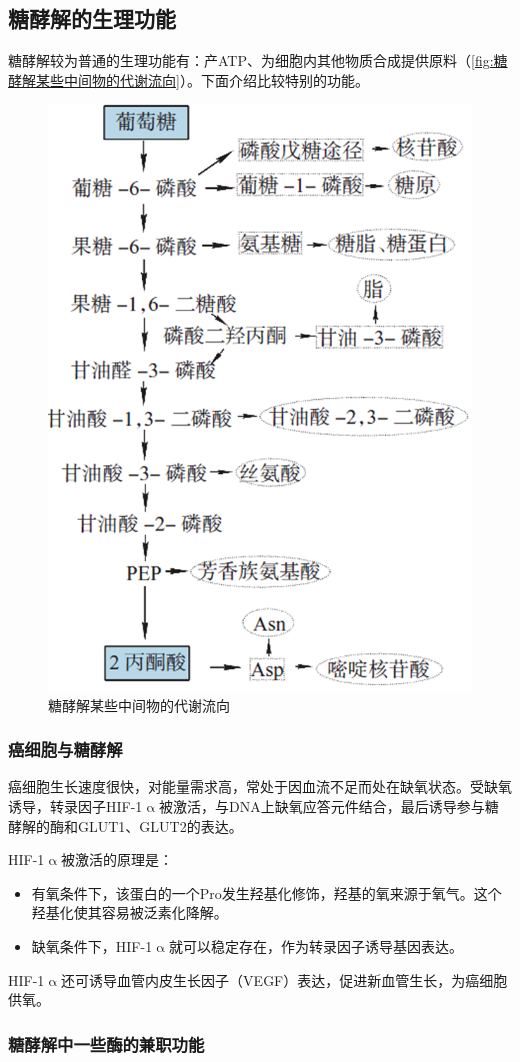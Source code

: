 \subsection{糖酵解的生理功能}

糖酵解较为普通的生理功能有：产ATP、为细胞内其他物质合成提供原料（\autoref{fig:糖酵解某些中间物的代谢流向}）。下面介绍比较特别的功能。

\begin{figure}[htbp]
	\centering
	\includegraphics[width=0.4\linewidth]{Pics/糖酵解某些中间物的代谢流向}
	\caption{糖酵解某些中间物的代谢流向}
	\label{fig:糖酵解某些中间物的代谢流向}
\end{figure}

\subsubsection{癌细胞与糖酵解}

癌细胞生长速度很快，对能量需求高，常处于因血流不足而处在缺氧状态。受缺氧诱导，转录因子HIF-1$\upalpha$被激活，与DNA上缺氧应答元件结合，最后诱导参与糖酵解的酶和GLUT1、GLUT2的表达。

HIF-1$\upalpha$被激活的原理是：
\begin{itemize}
	\item 有氧条件下，该蛋白的一个Pro发生羟基化修饰，羟基的氧来源于氧气。这个羟基化使其容易被泛素化降解。
	\item 缺氧条件下，HIF-1$\upalpha$就可以稳定存在，作为转录因子诱导基因表达。
\end{itemize}

HIF-1$\upalpha$还可诱导血管内皮生长因子（VEGF）表达，促进新血管生长，为癌细胞供氧。

\subsubsection{糖酵解中一些酶的兼职功能}

